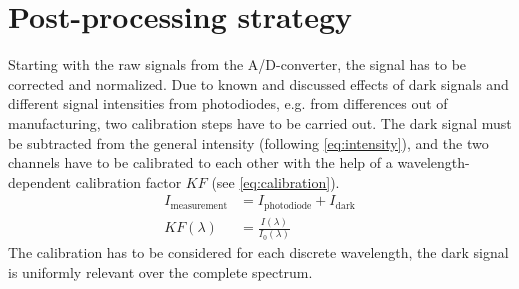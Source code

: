 \section{Post-processing strategy}
\label{sec:strategy}


Starting with the raw signals from the A/D-converter, the signal has to be corrected and normalized. Due to known and discussed effects of dark signals and different signal intensities from photodiodes, e.g. from differences out of manufacturing, two calibration steps have to be carried out. The dark signal must be subtracted from the general intensity (following \autoref{eq:intensity}), and the two channels have to be calibrated to each other with the help of a wavelength-dependent calibration factor $KF$ (see \autoref{eq:calibration}).
\begin{align}
    I_\mathrm{measurement}&=I_\mathrm{photodiode}+I_\mathrm{dark} \label{eq:intensity} \\[12pt]
    KF(\lambda)&=\frac{I(\lambda)}{I_\mathrm{0}(\lambda)} \label{eq:calibration}
\end{align}
The calibration has to be considered for each discrete wavelength, the dark signal is uniformly relevant over the complete spectrum.

